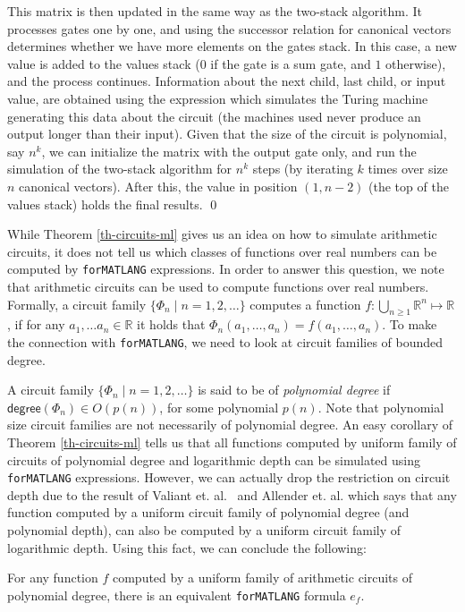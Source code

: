 \documentclass[sigconf]{acmart}
\newcommand{\langfor}{\texttt{for}\text{-}\texttt{MATLANG}\xspace}
\begin{document}
This matrix is then updated in the same way as the two-stack algorithm. It processes gates one by one, and using the successor relation for canonical vectors determines whether we have more elements on the gates stack. In this case, a new value is added to the values stack ($0$ if the gate is a sum gate, and $1$ otherwise), and the process continues. Information about the next child, last child, or input value, are obtained using the expression which simulates the Turing machine generating this data about the circuit (the machines used never produce an output longer than their input). Given that the size of the circuit is polynomial, say $n^k$, we can initialize the matrix with the output gate only, and run the simulation of the two-stack algorithm for $n^k$ steps (by iterating $k$ times over size $n$ canonical vectors). After this, the value in position  $(1,n-2)$ (the top of the values stack) holds the final results. \qed

\smallskip
While Theorem \ref{th-circuits-ml} gives us an idea on how to simulate arithmetic circuits, it does not tell us which classes of functions over real numbers can be computed by \langfor expressions. In order to answer this question, we note that arithmetic circuits can be used to compute functions over real numbers. Formally, a circuit family $\{\Phi_n\mid n=1,2,\ldots\}$ computes a function $f:\bigcup_{n\geq 1} \mathbb{R}^n\mapsto\mathbb{R}$, if for any $a_1,\ldots a_n\in \mathbb{R}$ it holds that $\Phi_n(a_1,\ldots ,a_n) = f(a_1,\ldots ,a_n)$. To make the connection with \langfor\!, we need to look at circuit families of bounded degree. 

A circuit family $\{\Phi_n\mid n=1,2,\ldots\}$ is said to be of \textit{polynomial degree} if $\mathsf{degree}(\Phi_n)\in O(p(n))$, for some polynomial $p(n)$. Note that polynomial size circuit families are not necessarily of polynomial degree. An easy corollary of Theorem \ref{th-circuits-ml} tells us that all functions computed by uniform family of circuits of polynomial degree and logarithmic depth can be simulated using \langfor expressions. However, we can actually drop the restriction on circuit depth due to the result of Valiant et. al.~\cite{valiant1981fast} and Allender et. al. \cite{AllenderJMV98} which says that any function computed by a uniform circuit family of polynomial degree (and polynomial depth), can also be computed by a uniform circuit family of logarithmic depth. Using this fact, we can conclude the following:


\begin{corollary}
\label{cor-circ-ml}
For any function $f$ computed by a uniform family of arithmetic circuits of polynomial degree, there is an equivalent \langfor formula $e_f$.
\end{corollary}
\end{document}
